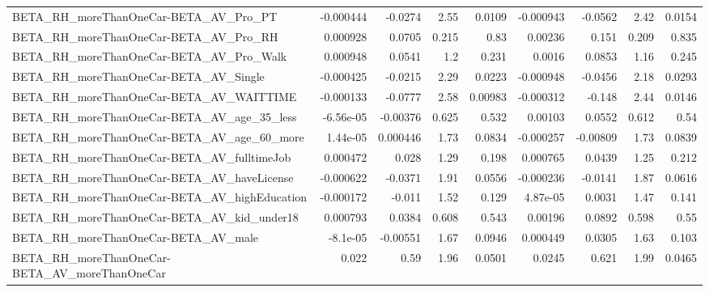 \begin{tabular}{lrrrrrrrr}
BETA\_RH\_moreThanOneCar-BETA\_AV\_Pro\_PT              &   -0.000444 &      -0.0274 &     2.55 &   0.0109 &  -0.000943 &     -0.0562 &         2.42 &        0.0154 \\
BETA\_RH\_moreThanOneCar-BETA\_AV\_Pro\_RH              &    0.000928 &       0.0705 &    0.215 &     0.83 &    0.00236 &       0.151 &        0.209 &         0.835 \\
BETA\_RH\_moreThanOneCar-BETA\_AV\_Pro\_Walk            &    0.000948 &       0.0541 &      1.2 &    0.231 &     0.0016 &      0.0853 &         1.16 &         0.245 \\
BETA\_RH\_moreThanOneCar-BETA\_AV\_Single              &   -0.000425 &      -0.0215 &     2.29 &   0.0223 &  -0.000948 &     -0.0456 &         2.18 &        0.0293 \\
BETA\_RH\_moreThanOneCar-BETA\_AV\_WAITTIME            &   -0.000133 &      -0.0777 &     2.58 &  0.00983 &  -0.000312 &      -0.148 &         2.44 &        0.0146 \\
BETA\_RH\_moreThanOneCar-BETA\_AV\_age\_35\_less         &   -6.56e-05 &     -0.00376 &    0.625 &    0.532 &    0.00103 &      0.0552 &        0.612 &          0.54 \\
BETA\_RH\_moreThanOneCar-BETA\_AV\_age\_60\_more         &    1.44e-05 &     0.000446 &     1.73 &   0.0834 &  -0.000257 &    -0.00809 &         1.73 &        0.0839 \\
BETA\_RH\_moreThanOneCar-BETA\_AV\_fulltimeJob         &    0.000472 &        0.028 &     1.29 &    0.198 &   0.000765 &      0.0439 &         1.25 &         0.212 \\
BETA\_RH\_moreThanOneCar-BETA\_AV\_haveLicense         &   -0.000622 &      -0.0371 &     1.91 &   0.0556 &  -0.000236 &     -0.0141 &         1.87 &        0.0616 \\
BETA\_RH\_moreThanOneCar-BETA\_AV\_highEducation       &   -0.000172 &       -0.011 &     1.52 &    0.129 &   4.87e-05 &      0.0031 &         1.47 &         0.141 \\
BETA\_RH\_moreThanOneCar-BETA\_AV\_kid\_under18         &    0.000793 &       0.0384 &    0.608 &    0.543 &    0.00196 &      0.0892 &        0.598 &          0.55 \\
BETA\_RH\_moreThanOneCar-BETA\_AV\_male                &    -8.1e-05 &     -0.00551 &     1.67 &   0.0946 &   0.000449 &      0.0305 &         1.63 &         0.103 \\
BETA\_RH\_moreThanOneCar-BETA\_AV\_moreThanOneCar      &       0.022 &         0.59 &     1.96 &   0.0501 &     0.0245 &       0.621 &         1.99 &        0.0465 \\

\end{tabular}
